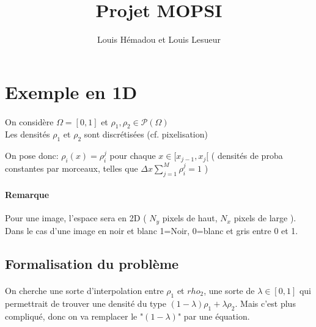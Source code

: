 \documentclass[11pt]{article}
\title{Projet MOPSI}
\author{Louis Hémadou et Louis Lesueur}
\date{}
\begin{document}
    \maketitle
    \section{Exemple en 1D}
    \paragraph{}
    On considère $\Omega = [0,1]$ et $\rho_1, \rho_2 \in \mathcal{P}(\Omega)$ \\
    Les densités $\rho_1$ et $\rho_2$ sont discrétisées (cf. pixelisation)
    
    \vspace{0.5cm}
    
    \vspace{0.5cm}
    
    On pose donc: $\rho_i(x) = \rho_i^j$ pour chaque $x \in [x_{j-1}, x_j[$ ( densités de proba constantes par morceaux, telles que $\Delta x \sum_{j=1}^{M} \rho_i^j  =1$ )
    
    \paragraph{Remarque} Pour une image, l'espace sera en 2D ( $N_y$ pixels de haut, $N_x$ pixels de large ). Dans le cas d'une image en noir et blanc 1=Noir, 0=blanc et gris entre 0 et 1.
    
    \subsection{Formalisation du problème}
    
    \paragraph{}
    On cherche une sorte d'interpolation entre $\rho_1$ et $rho_2$, une sorte de $\lambda \in [0,1]$ qui permettrait de trouver une densité du type $(1-\lambda) \rho_1 + \lambda \rho_2$. Mais c'est plus compliqué, donc on va remplacer le "$(1-\lambda)$" par une équation.
    
\end{document}
